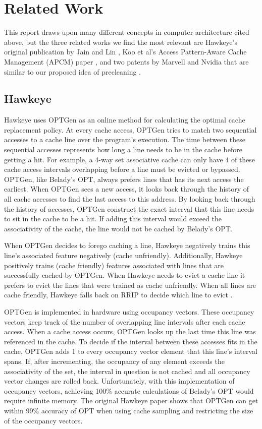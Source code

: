 \chapter{Related Work}

This report draws upon many different concepts in computer architecture cited above, but the three related works we find the most relevant are Hawkeye’s original publication by Jain and Lin \cite{hawkeye}, Koo et al’s Access Pattern-Aware Cache Management (APCM) paper \cite{apcm}, and two patents by Marvell and Nvidia that are similar to our proposed idea of precleaning \cite{preclean_cpu,preclean_nvidia_patent}.

\section{Hawkeye}
Hawkeye uses OPTGen as an online method for calculating the optimal cache replacement policy. At every cache access, OPTGen tries to match two sequential accesses to a cache line over the program's execution. The time between these sequential accesses represents how long a line needs to be in the cache before getting a hit. For example, a 4-way set associative cache can only have 4 of these cache access intervals overlapping before a line must be evicted or bypassed. OPTGen, like Belady’s OPT, always prefers lines that has its next access the earliest. When OPTGen sees a new access, it looks back through the history of all cache accesses to find the last access to this address. By looking back through the history of accesses, OPTGen construct the exact interval that this line needs to sit in the cache to be a hit. If adding this interval would exceed the associativity of the cache, the line would not be cached by Belady's OPT.

When OPTGen decides to forego caching a line, Hawkeye negatively trains this line’s associated feature negatively (cache unfriendly). Additionally, Hawkeye positively trains (cache friendly) features associated with lines that are successfully cached by OPTGen. When Hawkeye needs to evict a cache line it prefers to evict the lines that were trained as cache unfriendly. When all lines are cache friendly, Hawkeye falls back on RRIP to decide which line to evict \cite{rrip}. 

OPTGen is implemented in hardware using occupancy vectors. These occupancy vectors keep track of the number of overlapping line intervals after each cache access. When a cache access occurs, OPTGen looks up the last time this line was referenced in the cache. To decide if the interval between these accesses fits in the cache, OPTGen adds 1 to every occupancy vector element that this line's interval spans. If, after incrementing, the occupancy of any element exceeds the associativity of the set, the interval in question is not cached and all occupancy vector changes are rolled back. Unfortunately, with this implementation of occupancy vectors, achieving 100\% accurate calculations of Belady's OPT would require infinite memory. The original Hawkeye paper shows that OPTGen can get within 99\% accuracy of OPT when using cache sampling and restricting the size of the occupancy vectors.

